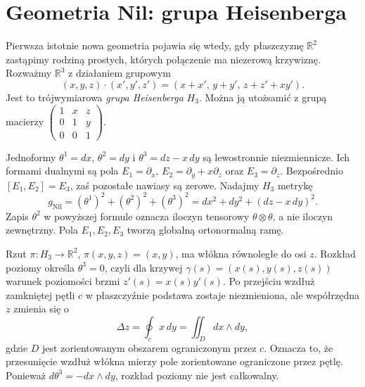 \section{Geometria Nil: grupa Heisenberga}
\label{sec:thurston-nil}

Pierwsza istotnie nowa geometria pojawia się wtedy, gdy płaszczyznę
$\mathbb R^2$ zastąpimy rodziną prostych, których połączenie ma
niezerową krzywiznę. Rozważmy $\mathbb R^3$ z działaniem grupowym
\[
(x,y,z)\cdot(x',y',z')=
(x+x',\,y+y',\,z+z'+xy').
\]
Jest to trójwymiarowa \emph{grupa Heisenberga} $H_3$. Można ją
utożsamić z grupą macierzy
$\left(\begin{smallmatrix}1&x&z\\0&1&y\\0&0&1\end{smallmatrix}\right)$.

Jednoformy $\theta^1=dx$, $\theta^2=dy$ i
$\theta^3=dz-x\,dy$ są lewostronnie niezmiennicze.
Ich formami dualnymi są pola
$E_1=\partial_x$, $E_2=\partial_y+x\partial_z$ oraz
$E_3=\partial_z$. Bezpośrednio
$[E_1,E_2]=E_3$, zaś pozostałe nawiasy są zerowe.
Nadajmy $H_3$ metrykę
\begin{equation}\label{eq:nil-metric}
 g_{\mathrm{Nil}}=(\theta^1)^2+(\theta^2)^2+(\theta^3)^2
 =dx^2+dy^2+(dz-x\,dy)^2.
\end{equation}
Zapis $\theta^2$ w powyższej formule oznacza iloczyn tensorowy
$\theta\otimes\theta$, a nie iloczyn zewnętrzny. Pola $E_1,E_2,E_3$
tworzą globalną ortonormalną ramę.

\begin{przyklad}
Rzut $\pi\colon H_3\to\mathbb R^2$, $\pi(x,y,z)=(x,y)$,
ma włókna równoległe do osi $z$. Rozkład poziomy określa
$\theta^3=0$, czyli dla krzywej $\gamma(s)=(x(s),y(s),z(s))$
warunek poziomości brzmi $z'(s)=x(s)y'(s)$. Po przejściu
wzdłuż zamkniętej pętli $c$ w płaszczyźnie podstawa zostaje
niezmieniona, ale współrzędna $z$ zmienia się o
\[
\Delta z=\oint_c x\,dy=\iint_D dx\wedge dy,
\]
gdzie $D$ jest zorientowanym obszarem ograniczonym przez $c$.
Oznacza to, że przesunięcie wzdłuż włókna mierzy pole zorientowane
ograniczone przez pętlę. Ponieważ $d\theta^3=-dx\wedge dy$,
rozkład poziomy nie jest całkowalny.
\end{przyklad}

